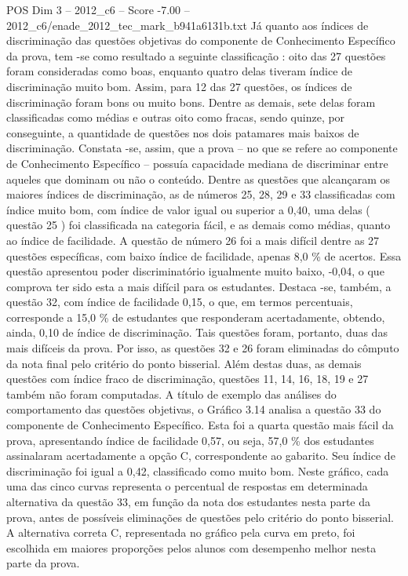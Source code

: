 \begin{textsample}{POS Dim 3 – 2012\_c6 – Score -7.00 – 2012\_c6/enade\_2012\_tec\_mark\_b941a6131b.txt}
Já quanto aos índices de discriminação das questões objetivas do componente de Conhecimento Específico da prova, tem -se como resultado a seguinte classificação : oito das 27 questões foram consideradas como boas, enquanto quatro delas tiveram índice de discriminação muito bom.
Assim, para 12 das 27 questões, os índices de discriminação foram bons ou muito bons.
Dentre as demais, sete delas foram classificadas como médias e outras oito como fracas, sendo quinze, por conseguinte, a quantidade de questões nos dois patamares mais baixos de discriminação.
Constata -se, assim, que a prova – no que se refere ao componente de Conhecimento Específico – possuía capacidade mediana de discriminar entre aqueles que dominam ou não o conteúdo.
Dentre as questões que alcançaram os maiores índices de discriminação, as de números 25, 28, 29 e 33 classificadas com índice muito bom, com índice de valor igual ou superior a 0,40, uma delas ( questão 25 ) foi classificada na categoria fácil, e as demais como médias, quanto ao índice de facilidade.
A questão de número 26 foi a mais difícil dentre as 27 questões específicas, com baixo índice de facilidade, apenas 8,0 \% de acertos.
Essa questão apresentou poder discriminatório igualmente muito baixo, -0,04, o que comprova ter sido esta a mais difícil para os estudantes.
Destaca -se, também, a questão 32, com índice de facilidade 0,15, o que, em termos percentuais, corresponde a 15,0 \% de estudantes que responderam acertadamente, obtendo, ainda, 0,10 de índice de discriminação.
Tais questões foram, portanto, duas das mais difíceis da prova.
Por isso, as questões 32 e 26 foram eliminadas do cômputo da nota final pelo critério do ponto bisserial.
Além destas duas, as demais questões com índice fraco de discriminação, questões 11, 14, 16, 18, 19 e 27 também não foram computadas.
A título de exemplo das análises do comportamento das questões objetivas, o Gráfico 3.14 analisa a questão 33 do componente de Conhecimento Específico.
Esta foi a quarta questão mais fácil da prova, apresentando índice de facilidade 0,57, ou seja, 57,0 \% dos estudantes assinalaram acertadamente a opção C, correspondente ao gabarito.
Seu índice de discriminação foi igual a 0,42, classificado como muito bom.
Neste gráfico, cada uma das cinco curvas representa o percentual de respostas em determinada alternativa da questão 33, em função da nota dos estudantes nesta parte da prova, antes de possíveis eliminações de questões pelo critério do ponto bisserial.
A alternativa correta C, representada no gráfico pela curva em preto, foi escolhida em maiores proporções pelos alunos com desempenho melhor nesta parte da prova.

\end{textsample}
